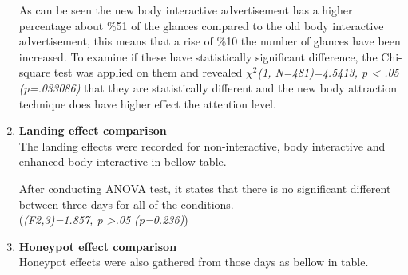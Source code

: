 \begin{enumerate}
As can be seen the new body interactive advertisement has a higher percentage about \%51 of the glances compared to the old body interactive advertisement, this means that a rise of \%10 the number of glances have been increased. To examine if these have statistically significant difference, the Chi-square test was applied on them and revealed ${\chi}^2$\emph{(1, N=481)=4.5413, p < .05 (p=.033086)} that they are statistically different and the new body attraction technique does have higher effect the attention level.


\item \textbf{Landing effect comparison}\\
The landing effects were recorded for non-interactive, body interactive and enhanced body interactive in bellow table.

\begin{table}[H]
\caption{Cross tabulation for each condition Landing effect }
\label{tab:newbodylandingeffect}
\centering
{}
\end{table}
After conducting ANOVA test, it states that there is no significant different between three days for all of the conditions.\\
(\emph{(F2,3)=1.857, p >.05 (p=0.236)})


\item \textbf{Honeypot effect comparison}\\
Honeypot effects were also gathered from those days as bellow in table.

\begin{table}[H]
\caption{Cross tabulation for each condition Honeypot effect }
\label{tab:newbodyhoneypoteffect}
\centering
{}
\end{table}


\end{enumerate}
